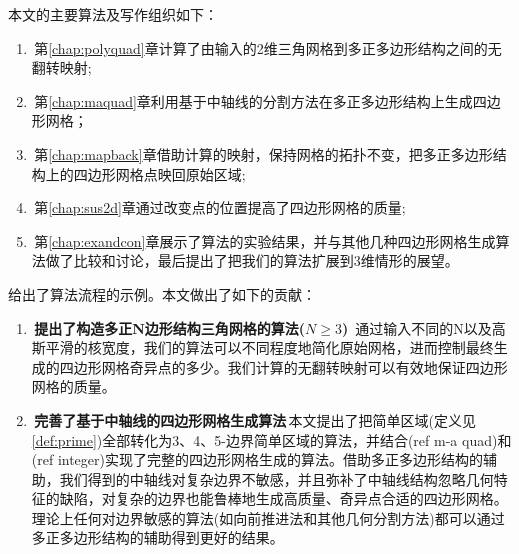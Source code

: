 本文的主要算法及写作组织如下：
\begin{enumerate}
	
\item\,第\ref{chap:polyquad}章计算了由输入的2维三角网格到多正多边形结构之间的无翻转映射;
\item\,第\ref{chap:maquad}章利用基于中轴线的分割方法在多正多边形结构上生成四边形网格；
\item\,第\ref{chap:mapback}章借助计算的映射，保持网格的拓扑不变，把多正多边形结构上的四边形网格点映回原始区域;%
\item\,第\ref{chap:sus2d}章通过改变点的位置提高了四边形网格的质量;
\item\,第\ref{chap:exandcon}章展示了算法的实验结果，并与其他几种四边形网格生成算法做了比较和讨论，最后提出了把我们的算法扩展到3维情形的展望。
\end{enumerate}
给出了算法流程的示例。本文做出了如下的贡献：
\begin{enumerate}
\item\,\textbf{提出了构造多正N边形结构三角网格的算法($N \geq 3$)} \,通过输入不同的N以及高斯平滑的核宽度，我们的算法可以不同程度地简化原始网格，进而控制最终生成的四边形网格奇异点的多少。我们计算的无翻转映射可以有效地保证四边形网格的质量。%

\item\,\textbf{完善了基于中轴线的四边形网格生成算法}\,本文提出了把简单区域(定义见\ref{def:prime})全部转化为3、4、5-边界简单区域的算法，并结合(ref m-a quad)和(ref integer)实现了完整的四边形网格生成的算法。借助多正多边形结构的辅助，我们得到的中轴线对复杂边界不敏感，并且弥补了中轴线结构忽略几何特征的缺陷，对复杂的边界也能鲁棒地生成高质量、奇异点合适的四边形网格。理论上任何对边界敏感的算法(如向前推进法和其他几何分割方法)都可以通过多正多边形结构的辅助得到更好的结果。
\end{enumerate}
